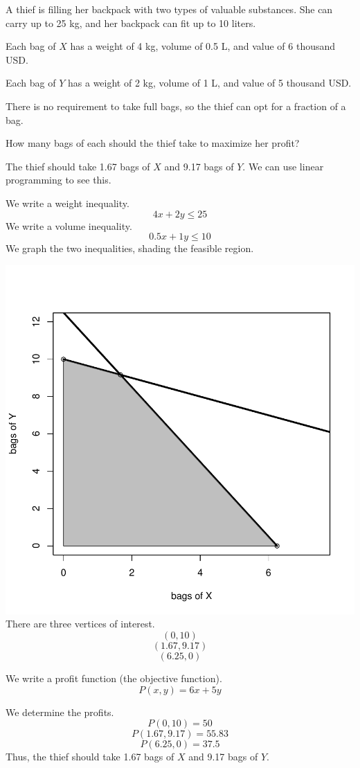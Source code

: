 
\begin{question}
A thief is filling her backpack with two types of valuable substances.
She can carry up to 25 kg, and her backpack can fit up to 10 liters.

Each bag of \(X\) has a weight of 4 kg, volume of 0.5 L, and value of 6
thousand USD.

Each bag of \(Y\) has a weight of 2 kg, volume of 1 L, and value of 5
thousand USD.

There is no requirement to take full bags, so the thief can opt for a
fraction of a bag.

How many bags of each should the thief take to maximize her profit?
\end{question}

\begin{solution}
The thief should take 1.67 bags of \(X\) and 9.17 bags of \(Y\). We can
use linear programming to see this.

We write a weight inequality. \[4x+2y \le 25\] We write a volume
inequality. \[0.5x+1y \le 10\] We graph the two inequalities, shading
the feasible region.

\includegraphics{unnamed-chunk-1-1-5.pdf}\\

There are three vertices of interest. \[(0,10) \] \[(1.67,9.17) \]
\[(6.25,0)\]

We write a profit function (the objective function). \[P(x,y) = 6x+5y \]

We determine the profits. \[P(0,10)=50 \] \[P(1.67,9.17)=55.83 \]
\[P(6.25,0)=37.5 \] Thus, the thief should take 1.67 bags of \(X\) and
9.17 bags of \(Y\).
\end{solution}

